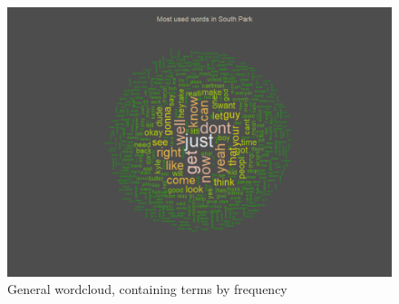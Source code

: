 \documentclass[10pt,a4paper]{article}
\begin{document}
	
	\begin{figure}[h]
	\centering
	\includegraphics[scale=0.9]{images/WordCloud.png}
	\caption{General wordcloud, containing terms by frequency}
	\label{fig:WordCloud}
	\end{figure}
	
\end{document}
